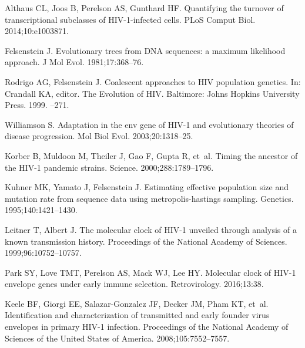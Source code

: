 \documentclass{bmcart}
\begin{document}
\begin{backmatter}
\begin{thebibliography}{10}
Althaus CL, Joos B, Perelson AS, Gunthard HF.
\newblock Quantifying the turnover of transcriptional subclasses of
  {HIV-1-infected} cells.
\newblock PLoS Comput Biol. 2014;\hspace{0pt}10:e1003871.

Felsenstein J.
\newblock Evolutionary trees from {DNA} sequences: a maximum likelihood
  approach.
\newblock J Mol Evol. 1981;\hspace{0pt}17:368--76.

Rodrigo AG, Felsenstein J.
\newblock Coalescent approaches to {HIV} population genetics.
\newblock In: Crandall KA, editor. The Evolution of HIV.
\newblock Baltimore: Johns Hopkins University Press. 1999.
--271.

Williamson S.
\newblock Adaptation in the env gene of {HIV-1} and evolutionary theories of
  disease progression.
\newblock Mol Biol Evol. 2003;\hspace{0pt}20:1318--25.

Korber B, Muldoon M, Theiler J, Gao F, Gupta R, et~al.
\newblock Timing the ancestor of the {HIV-1} pandemic strains.
\newblock Science. 2000;\hspace{0pt}288:1789--1796.

Kuhner MK, Yamato J, Felsenstein J.
\newblock Estimating effective population size and mutation rate from sequence
  data using metropolis-hastings sampling.
\newblock Genetics. 1995;\hspace{0pt}140:1421--1430.

Leitner T, Albert J.
\newblock The molecular clock of {HIV-1} unveiled through analysis of a known
  transmission history.
\newblock Proceedings of the National Academy of Sciences.
  1999;\hspace{0pt}96:10752--10757.

Park SY, Love TMT, Perelson AS, Mack WJ, Lee HY.
\newblock Molecular clock of {HIV-1} envelope genes under early immune
  selection.
\newblock Retrovirology. 2016;\hspace{0pt}13:38.

Keele BF, Giorgi EE, Salazar-Gonzalez JF, Decker JM, Pham KT, et~al.
\newblock Identification and characterization of transmitted and early founder
  virus envelopes in primary {HIV-1} infection.
\newblock Proceedings of the National Academy of Sciences of the United States
  of America. 2008;\hspace{0pt}105:7552--7557.


\end{thebibliography}
\end{backmatter}
\end{document}
